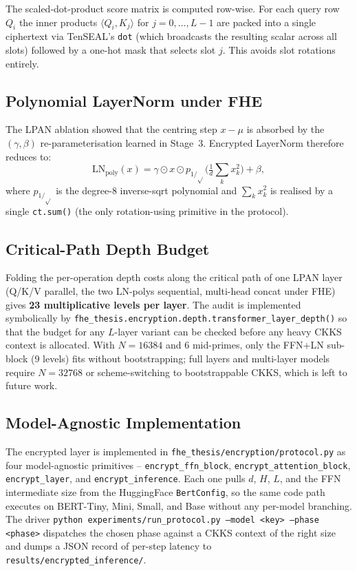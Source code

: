 The scaled-dot-product score matrix is computed row-wise. For each query row $Q_i$ the inner products $\langle Q_i, K_j\rangle$ for $j = 0, \ldots, L-1$ are packed into a single ciphertext via TenSEAL's \texttt{dot} (which broadcasts the resulting scalar across all slots) followed by a one-hot mask that selects slot $j$. This avoids slot rotations entirely.

\subsection{Polynomial LayerNorm under FHE}
The LPAN ablation showed that the centring step $x - \mu$ is absorbed by the $(\gamma, \beta)$ re-parameterisation learned in Stage~3. Encrypted LayerNorm therefore reduces to:
\begin{equation}
\mathrm{LN}_\mathrm{poly}(x) = \gamma \odot x \odot p_{1/\sqrt{}}\!\!\bigl(\tfrac{1}{d}\textstyle\sum_k x_k^2\bigr) + \beta,
\end{equation}
where $p_{1/\sqrt{}}$ is the degree-8 inverse-sqrt polynomial and $\sum_k x_k^2$ is realised by a single \texttt{ct.sum()} (the only rotation-using primitive in the protocol).

\subsection{Critical-Path Depth Budget}
Folding the per-operation depth costs along the critical path of one LPAN layer (Q/K/V parallel, the two LN-polys sequential, multi-head concat under FHE) gives \textbf{23 multiplicative levels per layer}. The audit is implemented symbolically by \texttt{fhe\_thesis.encryption.depth.transformer\_layer\_depth()} so that the budget for any $L$-layer variant can be checked before any heavy CKKS context is allocated. With $N = 16384$ and 6 mid-primes, only the FFN+LN sub-block (9 levels) fits without bootstrapping; full layers and multi-layer models require $N = 32768$ or scheme-switching to bootstrappable CKKS, which is left to future work.

\subsection{Model-Agnostic Implementation}
The encrypted layer is implemented in \texttt{fhe\_thesis/encryption/protocol.py} as four model-agnostic primitives -- \texttt{encrypt\_ffn\_block}, \texttt{encrypt\_attention\_block}, \texttt{encrypt\_layer}, and \texttt{encrypt\_inference}. Each one pulls $d$, $H$, $L$, and the FFN intermediate size from the HuggingFace \texttt{BertConfig}, so the same code path executes on BERT-Tiny, Mini, Small, and Base without any per-model branching. The driver \texttt{python experiments/run\_protocol.py --model <key> --phase <phase>} dispatches the chosen phase against a CKKS context of the right size and dumps a JSON record of per-step latency to \texttt{results/encrypted\_inference/}.

